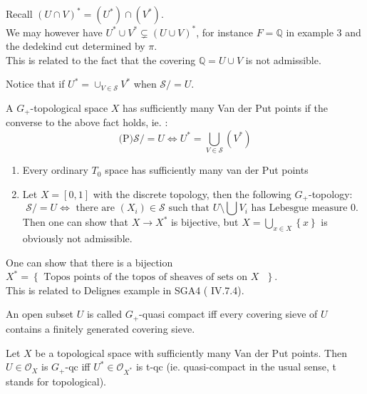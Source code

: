 \documentclass[../main.tex]{subfiles}
\begin{document}
\begin{rmq}
Recall $( U\cap V)^{\ast}= ( U^{\ast}) \cap ( V^{\ast}) $.\\
We may however have $U^{\ast}\cup V^{\ast}\subsetneq ( U\cup V)^{\ast}$, for instance $F= \mathbb{Q}$ in example 3 and the dedekind cut determined by $\pi$.\\
This is related to the fact that the covering $\mathbb{Q}= U \cup V$ is not admissible.
\end{rmq}
Notice that if $U^{\ast}= \cup_{V\in \mathcal{S}} V^{\ast}$ when $ \mathcal{S} /= U$.
\begin{defn}
	A $G_+$-topological space $X$ has sufficiently many Van der Put points if the converse to the above fact holds, ie. :
	\[ 
		\text{(P)} \mathcal{S}/= U \iff U^{\ast}= \bigcup_{V\in \mathcal{S}} ( V^{\ast}) 
	\]
\end{defn}
\begin{exemple}
\begin{enumerate}
\item Every ordinary $T_0$ space has sufficiently many van der Put points 
\item Let $X = [ 0,1] $ with the discrete topology, then the following $G_+$-topology:
	\[ 
	\mathcal{S} /= U \iff \text{ there are $( X_i) \in \mathcal{S}$ such that $U \setminus \bigcup V_i$ has Lebesgue measure 0. } 
	\]
	Then one can show that $X\to X^{\ast}$ is bijective, but $X= \bigcup_{x\in X} \left\{ x \right\} $ is obviously not admissible.
\end{enumerate}
\end{exemple}
One can show that there is a bijection $X^{\ast}= \left\{ \text{ Topos points of the topos of sheaves of sets on $X$  }  \right\} $.\\
This is related to Delignes example in SGA4 ( IV.7.4).\\
\begin{defn}
	An open subset $U$ is called $G_+$-quasi compact iff every covering sieve of $U$ contains a finitely generated covering sieve.
\end{defn}
\begin{propo}
Let $X$ be a topological space with sufficiently many Van der Put points. Then $U \in \mathcal{O}_X$ is $G_+$-qc iff $U^{\ast}\in \mathcal{O}_{X^{\ast}} $ is t-qc (ie. quasi-compact in the usual sense, t stands for topological).
\end{propo}
\end{document}
